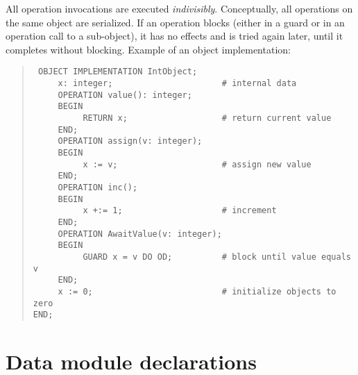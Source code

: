 \documentclass[10pt]{article}
\begin{document}
All operation invocations are executed {\em indivisibly}.
Conceptually, all operations on the same object are serialized.
If an operation blocks (either in a guard or in an operation call to
a sub-object), it has no effects and is tried
again later, until it completes without blocking.
Example of an object implementation:
\begin{quote}\tt
OBJECT IMPLEMENTATION IntObject; \\
\mbox{~~~~~}x:~integer;~~~~~~~~~~~~~~~~~~~~~~\# internal data \\
\mbox{~~~~~}OPERATION value():~integer; \\
\mbox{~~~~~}BEGIN \\
\mbox{~~~~~~~~~~}RETURN x;~~~~~~~~~~~~~~~~~~~\# return current value \\
\mbox{~~~~~}END; \\
\mbox{~~~~~}OPERATION assign(v:~integer); \\
\mbox{~~~~~}BEGIN \\
\mbox{~~~~~~~~~~}x := v;~~~~~~~~~~~~~~~~~~~~~\# assign new value \\
\mbox{~~~~~}END; \\
\mbox{~~~~~}OPERATION inc(); \\
\mbox{~~~~~}BEGIN \\
\mbox{~~~~~~~~~~}x +:= 1;~~~~~~~~~~~~~~~~~~~~\# increment \\
\mbox{~~~~~}END; \\
\mbox{~~~~~}OPERATION AwaitValue(v:~integer); \\
\mbox{~~~~~}BEGIN \\
\mbox{~~~~~~~~~~}GUARD x = v DO OD;~~~~~~~~~~\# block until value equals v \\
\mbox{~~~~~}END; \\
\mbox{~~~~~}x := 0;~~~~~~~~~~~~~~~~~~~~~~~~~~\# initialize objects to zero \\
END;
\end{quote}
\section{Data module declarations}\label{sec:data_modules}
\end{document}
